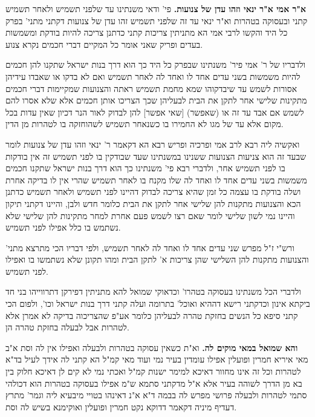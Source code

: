 \documentclass[12pt, openany]{book}
\begin{document}
{\par\textbf{א"ר אמי א"ר ינאי וזהו עדן של צנועות.}  פי' ודאי משנתינו עד שלפני תשמיש ולאחר תשמיש קתני ובעסוקה בטהרות וא"ר ינאי עד זה שלפני תשמיש זהו עדן של צנועות דקתני מתני' בפרק כל היד והקשו לרבי אמי הא מתניתין צריכות קתני כדתנן צריכה להיות בודקת ומשמשות בעדים ופריק שאני אומר כל המקיים דברי חכמים נקרא צנוע.\par  ולדבריו של ר' אמי פיר' משנתינו שבפרק כל היד כך הוא דרך בנות ישראל שתקנו להן חכמים להיות משמשות בשני עדים אחד לו ואחד לה לאחר תשמיש ואם לא בדקו או שאבדו עידיהן אסורות לשמש עד שיבדקוהו שמא מחמת תשמיש ראתה והצנועות שמקיימות דברי חכמים מתקינות שלישי אחר לתקן את הבית לבעליהן שכך הצריכו אותן חכמים אלא שלא אסרו להם לשמש אם אבד עד זה או (שאפשר) [שאי אפשר] להן לבדוק לאור הנר דכיון שאין עדות בכל מקום אלא עד של מגו לא החמירו בו כשנאחר תשמיש לשהוחזקה בו לטהרות מן הדין.\par  ואקשיה ליה רבא לרב אמי ופרכיה ופריש רבא הא דקאמר ר' ינאי וזהו עדן של צנועות לומר שבעד זה הוא צניעות הצנועות ששנינו במשנתינו שעד שבודקין בו לפני תשמיש זה אין בודקות בו לפני תשמיש אחר, ולדברי רבא פי' משנתינו כך הוא דרך בנות ישראל שתקנו חכמים משמשות בשני עדים אחד לו ואחד לה שלו מקנח בו לאחר תשמיש שהרי אין לו בדיקה אחרת ושלה בודקת בו עצמה כל זמן שהיא צריכה לבדוק דהיינו לפני תשמיש ולאחר תשמיש כדתנן הכא והצנועות מתקנות להן שלישי אחר לתקן את הבית כלומר חדש ולבן, והיינו דקתני תיקון והיינו נמי לשון שלישי לומר שאם רצו לשמש פעם אחרת למחר מתקינות להן שלישי שלא נשתמש בו כלל אפילו לפני תשמיש.\par  ורש"י ז"ל מפרש שני עדים אחד לו ואחד לה לאחר תשמיש, ולפי דבריו הכי מתרצא מתני' והצנועות מתקנות להן השלישי שהן צריכות א' לתקן הבית ומהו תקונן שלא נשתמשו בו ואפילו לפני תשמיש.\par  ולדברי הכל משנתינו בעסוקה בטהרו' וכדאוקי שמואל להא מתניתין דפירקן דתרווייהו בני חד ביקתא אינון וכדקתני רישא דההיא ואוכל' בתרומה ועלה קתני דרך בנות ישראל וכו', ולפום הכי קתני סיפא כל הנשים בחזקת טהרה לבעליהן כלומר אע"פ שהצריכוה בדיקה לא אמרן אלא לטהרות אבל לבעלה בחזקת טהרה הן. 
\par\textbf{והא שמואל במאי מוקים לה.}  וא"ת כשאין עסוקה בטהרות ולבעלה ואפילו אין לה וסת א"ב מאי איריא חמרין ופועלין אפילו עומדין בעיר נמי ועוד מאי קמ"ל הא קתני לה אידך לעיל בד"א לטהרות וכל זה אינו מחוור דאיכא למימר ישנות קמ"ל ואכתי נמי לא קים לן דאיכא חלוק בין בא מן הדרך לשוהה בעיר אלא א"ל מדקתני סתמא ש"מ אפילו בעסוקה בטהרות הוא דכולהי סתמי לטהרות ולבעלה פרושי מפרש לה בבמה ד"א א"נ דאינהו בטויי מיבעיא ליה וגמר' מתרץ דעדיף מיניה דקאמר דדוקא נקט חמרין ופועלין ואוקימנא בשיש לה וסת. 
}
\end{document}
